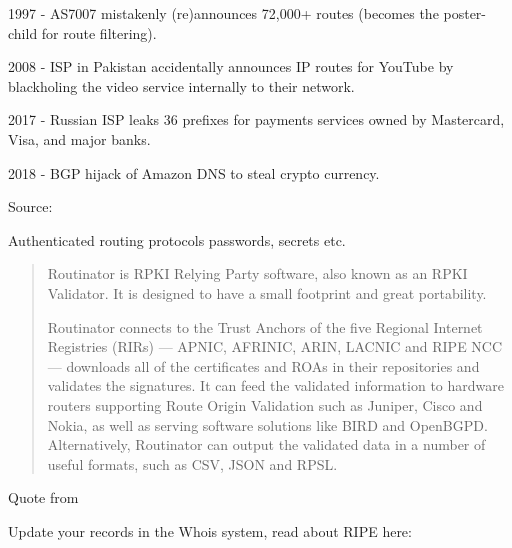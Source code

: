 \documentclass[Screen16to9,17pt]{foils}
\begin{document}

\begin{list2}
\item 1997 - AS7007 mistakenly (re)announces 72,000+ routes (becomes the poster-child for route filtering).
\item 2008 - ISP in Pakistan accidentally announces IP routes for YouTube by blackholing the video service internally to their network.
\item 2017 - Russian ISP leaks 36 prefixes for payments services owned by Mastercard, Visa, and major banks.
\item 2018 - BGP hijack of Amazon DNS to steal crypto currency.
\end{list2}
Source: 

\begin{list1}
\item {}
\item Authenticated routing protocols passwords, secrets etc.
\end{list1}


\begin{quote}
  Routinator is RPKI Relying Party software, also known as an RPKI Validator. It is designed to have a small footprint and great portability.

Routinator connects to the Trust Anchors of the five Regional Internet Registries (RIRs) — APNIC, AFRINIC, ARIN, LACNIC and RIPE NCC — downloads all of the certificates and ROAs in their repositories and validates the signatures. It can feed the validated information to hardware routers supporting Route Origin Validation such as Juniper, Cisco and Nokia, as well as serving software solutions like BIRD and OpenBGPD. Alternatively, Routinator can output the validated data in a number of useful formats, such as CSV, JSON and RPSL.
\end{quote}

\begin{list1}
\item Quote from {\small{}}
\item Update your records in the Whois system, read about RIPE here:\\ {\small{}}
\end{list1}
\end{document}
